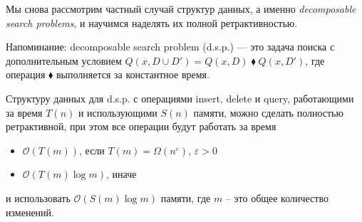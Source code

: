 Мы снова рассмотрим частный случай структур данных, а именно {\it decomposable search problems}, и научимся наделять их полной ретрактивностью. 

Напоминание: decomposable search problem (d.s.p.) --- это задача поиска с дополнительным условием $Q(x, D \cup D') = Q(x, D) \; \blacklozenge \; Q(x, D')$, 
где операция $\blacklozenge$ выполняется за константное время.

\begin{theorem} 

Структуру данных для d.s.p. с операциями insert, delete и query, работающими за время $T(n)$ и использующими $S(n)$ памяти, можно сделать полностью ретрактивной,
при этом все операции будут работать за время

\end{theorem}

\begin{itemize}

\item $\mathcal{O}(T(m))$, если $T(m) = \Omega(n^{\varepsilon})$, $\varepsilon > 0$
\item $\mathcal{O}(T(m) \log m)$, иначе

\end{itemize}

и использовать $\mathcal{O}(S(m) \log m)$ памяти, где $m$ -- это общее количество изменений.

